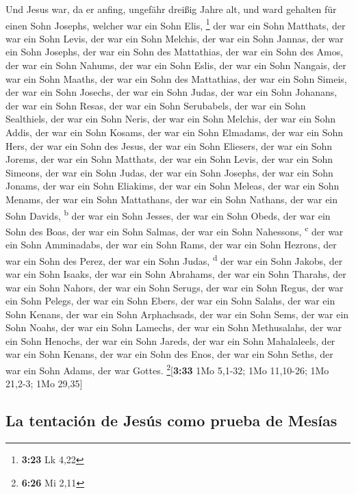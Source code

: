  Und Jesus war, da er anfing, ungefähr dreißig Jahre alt,
und ward gehalten für einen Sohn Josephs, welcher war ein Sohn Elis,
\footnote{\textbf{3:23} Lk 4,22}  der war ein Sohn
Matthats, der war ein Sohn Levis, der war ein Sohn Melchis, der war ein
Sohn Jannas, der war ein Sohn Josephs,  der war ein Sohn
des Mattathias, der war ein Sohn des Amos, der war ein Sohn Nahums, der
war ein Sohn Eslis, der war ein Sohn Nangais,  der war
ein Sohn Maaths, der war ein Sohn des Mattathias, der war ein Sohn
Simeis, der war ein Sohn Josechs, der war ein Sohn Judas,
 der war ein Sohn Johanans, der war ein Sohn Resas, der
war ein Sohn Serubabels, der war ein Sohn Sealthiels, der war ein Sohn
Neris,  der war ein Sohn Melchis, der war ein Sohn Addis,
der war ein Sohn Kosams, der war ein Sohn Elmadams, der war ein Sohn
Hers,  der war ein Sohn des Jesus, der war ein Sohn
Eliesers, der war ein Sohn Jorems, der war ein Sohn Matthats, der war
ein Sohn Levis,  der war ein Sohn Simeons, der war ein
Sohn Judas, der war ein Sohn Josephs, der war ein Sohn Jonams, der war
ein Sohn Eliakims,  der war ein Sohn Meleas, der war ein
Sohn Menams, der war ein Sohn Mattathans, der war ein Sohn Nathans, der
war ein Sohn Davids, \textsuperscript{b}  der war ein
Sohn Jesses, der war ein Sohn Obeds, der war ein Sohn des Boas, der war
ein Sohn Salmas, der war ein Sohn Nahessons, \textsuperscript{c}
 der war ein Sohn Amminadabs, der war ein Sohn Rams, der
war ein Sohn Hezrons, der war ein Sohn des Perez, der war ein Sohn
Judas, \textsuperscript{d}  der war ein Sohn Jakobs, der
war ein Sohn Isaaks, der war ein Sohn Abrahams, der war ein Sohn
Tharahs, der war ein Sohn Nahors,  der war ein Sohn
Serugs, der war ein Sohn Regus, der war ein Sohn Pelegs, der war ein
Sohn Ebers, der war ein Sohn Salahs,  der war ein Sohn
Kenans, der war ein Sohn Arphachsads, der war ein Sohn Sems, der war ein
Sohn Noahs, der war ein Sohn Lamechs,  der war ein Sohn
Methusalahs, der war ein Sohn Henochs, der war ein Sohn Jareds, der war
ein Sohn Mahalaleels, der war ein Sohn Kenans,  der war
ein Sohn des Enos, der war ein Sohn Seths, der war ein Sohn Adams, der
war Gottes. \footnote{\textbf{6:26} Mi 2,11}{[}\textbf{3:33} 1Mo 5,1-32;
1Mo 11,10-26; 1Mo 21,2-3; 1Mo 29,35{]}

\hypertarget{la-tentaciuxf3n-de-jesuxfas-como-prueba-de-mesuxedas}{%
\subsection{La tentación de Jesús como prueba de
Mesías}\label{la-tentaciuxf3n-de-jesuxfas-como-prueba-de-mesuxedas}}

